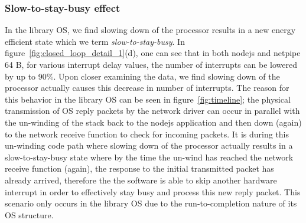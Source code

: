 \subsubsection{Slow-to-stay-busy effect}
In the library OS, we find slowing down of the processor results in a new energy efficient state which we term \textit{slow-to-stay-busy}. In figure~\ref{fig:closed_loop_detail_1}(d), one can see that in both nodejs and netpipe 64 B, for various interrupt delay values, the number of interrupts can be lowered by up to 90\%. Upon closer examining the data, we find slowing down of the processor actually causes this decrease in number of interrupts. The reason for this behavior in the library OS can be seen in figure~\ref{fig:timeline}; the physical transmission of OS reply packets by the network driver can occur in parallel with the un-winding of the stack back to the nodejs application and then down (again) to the network receive function to check for incoming packets. It is during this un-winding code path where slowing down of the processor actually results in a slow-to-stay-busy state where by the time the un-wind has reached the network receive function (again), the response to the initial transmitted packet has already arrived, therefore the the software is able to skip another hardware interrupt in order to effectively stay busy and process this new reply packet. This scenario only occurs in the library OS due to the run-to-completion nature of its OS structure.



